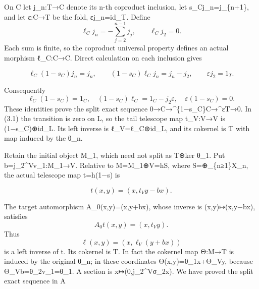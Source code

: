 On C let j\_\allowbreak{}n:\allowbreak{}T\allowbreak{}→C denote its n-th coproduct inclusion,\allowbreak{} let s\_\allowbreak{}Cj\_\allowbreak{}n\allowbreak{}=j\_\allowbreak{}\{n\allowbreak{}+1\},\allowbreak{} and let ε:\allowbreak{}C\allowbreak{}→T be the fold,\allowbreak{} εj\_\allowbreak{}n\allowbreak{}=id\_\allowbreak{}T. Define \[
 \ell_Cj_n=-\sum_{j=2}^{n-1}j_j,\qquad
 \ell_Cj_2=0.
\] Each sum is finite,\allowbreak{} so the coproduct universal property defines an actual morphism ℓ\_\allowbreak{}C:\allowbreak{}C\allowbreak{}→C. Direct calculation on each inclusion gives

\[
 \ell_C(1-s_C)j_n=j_n,\qquad
 (1-s_C)\ell_Cj_n=j_n-j_2,\qquad \varepsilon j_2=1_T.
\]

Consequently \[
 \ell_C(1-s_C)=1_C,\quad
 (1-s_C)\ell_C=1_C-j_2\varepsilon,\quad
 \varepsilon(1-s_C)=0.
\] These identities prove the split exact sequence 0\allowbreak{}→C\allowbreak{}→\textasciicircum{}\{1−s\_\allowbreak{}C\}C\allowbreak{}→\textasciicircum{}εT\allowbreak{}→0. In (3.1)\allowbreak{} the transition is zero on L,\allowbreak{} so the tail telescope map t\_\allowbreak{}V:\allowbreak{}V\allowbreak{}→V is (1−s\_\allowbreak{}C)\allowbreak{}\allowbreak{}⊕id\_\allowbreak{}L. Its left inverse is ℓ\_\allowbreak{}V\allowbreak{}=ℓ\_\allowbreak{}C\allowbreak{}⊕id\_\allowbreak{}L,\allowbreak{} and its cokernel is T with map induced by the θ\_\allowbreak{}n.

Retain the initial object M\_\allowbreak{}1,\allowbreak{} which need not split as T\allowbreak{}⊕ker θ\_\allowbreak{}1. Put b\allowbreak{}=j\_\allowbreak{}2\textasciicircum{}Vv\_\allowbreak{}1:\allowbreak{}M\_\allowbreak{}1\allowbreak{}→V. Relative to M\allowbreak{}=M\_\allowbreak{}1\allowbreak{}⊕V\allowbreak{}=hS,\allowbreak{} where S\allowbreak{}=\allowbreak{}⊕\_\allowbreak{}\{n≥1\}X\_\allowbreak{}n,\allowbreak{} the actual telescope map t\allowbreak{}=h(1−s)\allowbreak{} is

\[
 t(x,y)=(x,t_Vy-bx).
\]

The target automorphism A\_\allowbreak{}0(x,\allowbreak{}y)\allowbreak{}\allowbreak{}=(x,\allowbreak{}y\allowbreak{}+bx)\allowbreak{},\allowbreak{} whose inverse is (x,\allowbreak{}y)\allowbreak{}\allowbreak{}↦(x,\allowbreak{}y−bx)\allowbreak{},\allowbreak{} satisfies \[
 A_0t(x,y)=(x,t_Vy).
\] Thus \[
 \ell(x,y)=(x,\ell_V(y+bx))
\] is a left inverse of t. Its cokernel is T. In fact the cokernel map Θ:\allowbreak{}M\allowbreak{}→T is induced by the original θ\_\allowbreak{}n; in these coordinates Θ(x,\allowbreak{}y)\allowbreak{}\allowbreak{}=θ\_\allowbreak{}1x\allowbreak{}+Θ\_\allowbreak{}Vy,\allowbreak{} because Θ\_\allowbreak{}Vb\allowbreak{}=θ\_\allowbreak{}2v\_\allowbreak{}1\allowbreak{}=θ\_\allowbreak{}1. A section is x\allowbreak{}↦(0,\allowbreak{}j\_\allowbreak{}2\textasciicircum{}Vσ\_\allowbreak{}2x)\allowbreak{}. We have proved the split exact sequence in A

